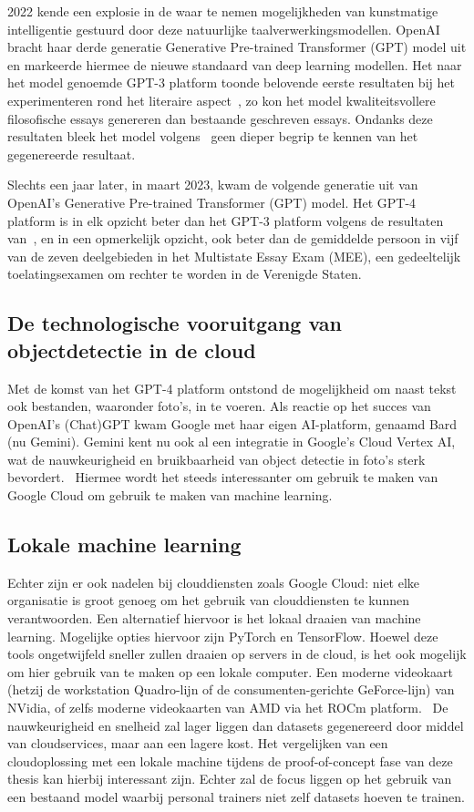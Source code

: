 2022 kende een explosie in de waar te nemen mogelijkheden van kunstmatige intelligentie gestuurd door deze natuurlijke taalverwerkingsmodellen.
OpenAI bracht haar derde generatie Generative Pre-trained Transformer (GPT) model uit en markeerde hiermee de nieuwe standaard van deep learning modellen.
Het naar het model genoemde GPT-3 platform toonde belovende eerste resultaten bij het experimenteren rond het literaire aspect~\autocite{Elkins2020}, zo kon het model kwaliteitsvollere filosofische essays genereren dan bestaande geschreven essays.
Ondanks deze resultaten bleek het model volgens~\textcite{Floridi2020} geen dieper begrip te kennen van het gegenereerde resultaat.

Slechts een jaar later, in maart 2023, kwam de volgende generatie uit van OpenAI's Generative Pre-trained Transformer (GPT) model.
Het GPT-4 platform is in elk opzicht beter dan het GPT-3 platform volgens de resultaten van~\textcite{Katz2023}, en in een opmerkelijk opzicht, ook beter dan de gemiddelde persoon in vijf van de zeven deelgebieden in het Multistate Essay Exam (MEE), een gedeeltelijk toelatingsexamen om rechter te worden in de Verenigde Staten.

\subsection{De technologische vooruitgang van objectdetectie in de cloud}
\label{subsec:effect-objectdetectie-cloud}
Met de komst van het GPT-4 platform ontstond de mogelijkheid om naast tekst ook bestanden, waaronder foto's, in te voeren.
Als reactie op het succes van OpenAI's (Chat)GPT kwam Google met haar eigen AI-platform, genaamd Bard (nu Gemini).
Gemini kent nu ook al een integratie in Google's Cloud Vertex AI, wat de nauwkeurigheid en bruikbaarheid van object detectie in foto's sterk bevordert.~\autocite{GoogleCloud2024}
Hiermee wordt het steeds interessanter om gebruik te maken van Google Cloud om gebruik te maken van machine learning.

\subsection{Lokale machine learning}
\label{subsec:benefits-hmd}
Echter zijn er ook nadelen bij clouddiensten zoals Google Cloud: niet elke organisatie is groot genoeg om het gebruik van clouddiensten te kunnen verantwoorden.
Een alternatief hiervoor is het lokaal draaien van machine learning.
Mogelijke opties hiervoor zijn PyTorch en TensorFlow.
Hoewel deze tools ongetwijfeld sneller zullen draaien op servers in de cloud, is het ook mogelijk om hier gebruik van te maken op een lokale computer.
Een moderne videokaart (hetzij de workstation Quadro-lijn of de consumenten-gerichte GeForce-lijn) van NVidia, of zelfs moderne videokaarten van AMD via het ROCm platform.~\autocite{AMD2024}
De nauwkeurigheid en snelheid zal lager liggen dan datasets gegenereerd door middel van cloudservices, maar aan een lagere kost.
Het vergelijken van een cloudoplossing met een lokale machine tijdens de proof-of-concept fase van deze thesis kan hierbij interessant zijn.
Echter zal de focus liggen op het gebruik van een bestaand model waarbij personal trainers niet zelf datasets hoeven te trainen.

